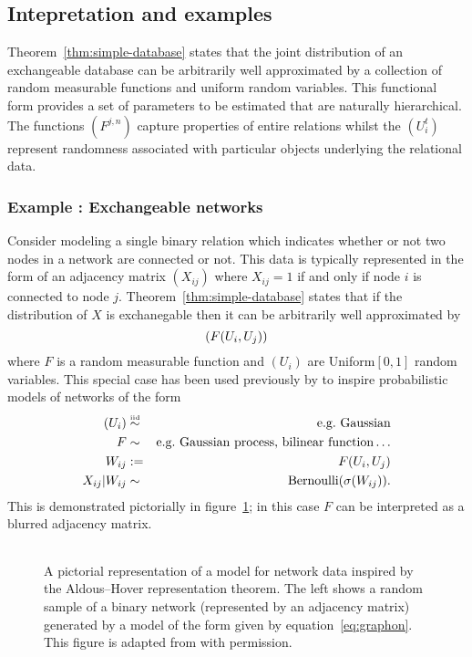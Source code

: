 \subsection{Intepretation and examples}

Theorem~\ref{thm:simple-database} states that the joint distribution of an exchangeable database can be arbitrarily well approximated by a collection of random measurable functions and uniform random variables.
This functional form provides a set of parameters to be estimated that are naturally hierarchical.
The functions $(F^{j,n})$ capture properties of entire relations whilst the $(U^t_i)$ represent randomness associated with particular objects underlying the relational data.

\subsubsection{Example : Exchangeable networks}

Consider modeling a single binary relation which indicates whether or not two nodes in a network are connected or not.
This data is typically represented in the form of an adjacency matrix $(X_{ij})$ where $X_{ij} = 1$ if and only if node $i$ is connected to node $j$.
Theorem~\ref{thm:simple-database} states that if the distribution of $X$ is exchanegable then it can be arbitrarily well approximated by
\begin{equation}
(F(U_i, U_j))
\end{equation}
where $F$ is a random measurable function and $(U_i)$ are \iid Uniform$[0,1]$ random variables.
This special case has been used previously by \cite{Hoff2007a,Roy2009,Lloyd2012} to inspire probabilistic models of networks of the form
\begin{eqnarray}
(U_i) & \overset{\mbox{\tiny iid}}{\sim} & \textrm{e.g.\ Gaussian} \\
F & \sim & \textrm{e.g.\ Gaussian process, bilinear function}\ldots \\
W_{ij} & := & F(U_i, U_j) \\
X_{ij} | W_{ij} & \sim & \textrm{Bernoulli}(\sigma(W_{ij}))\label{eq:graphon}.
\end{eqnarray}
This is demonstrated pictorially in figure~\ref{fig:graphon}; in this case $F$ can be interpreted as a blurred adjacency matrix.

\begin{figure}[ht]
\centering
\begin{tabular}{c}

\end{tabular}
\caption{
A pictorial representation of a model for network data inspired by the Aldous--Hover representation theorem.
The left shows a random sample of a binary network (represented by an adjacency matrix) generated by a model of the form given by equation~\eqref{eq:graphon}.
This figure is adapted from \cite{Lloyd2012} with permission.}
\label{fig:graphon}
\end{figure}


